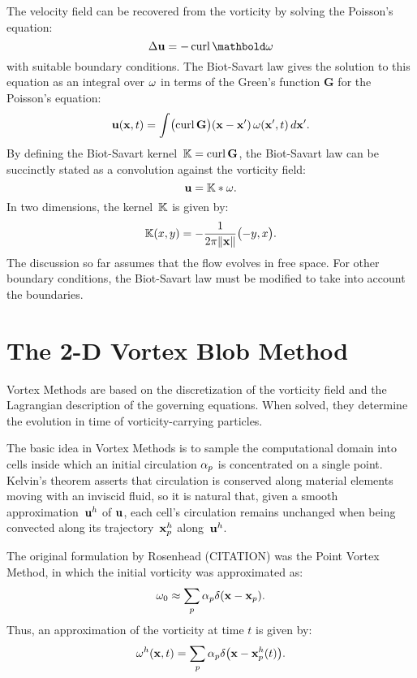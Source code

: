 The velocity field can be recovered from the vorticity by solving the Poisson's equation:
\begin{equation}
  \lapl\vel = -\curl\mathbold\vort
\end{equation}
with suitable boundary conditions.
The Biot-Savart law gives the solution to this equation as an integral over \(\omega\)
in terms of the Green's function \(\mathbf G\) for the Poisson's equation:
\begin{equation}
  \label{eq:integral-biot-savart-law}
  \mathbf u(\mathbf x, t) = \int\bigl(\operatorname{curl}\mathbf G\bigr)(\mathbf x - \mathbf x')\,\omega(\mathbf x', t)\,d\mathbf x'.
\end{equation}
By defining the Biot-Savart kernel~\(\mathbb{K} = \operatorname{curl}\mathbf G\),
the Biot-Savart law can be succinctly stated as a convolution against the vorticity field:
\begin{equation}
  \label{eq:biot-savart-law}
  \mathbf u = \mathbb{K} * \omega.
\end{equation}
In two dimensions, the kernel~\(\mathbb{K}\) is given by:
\begin{equation}
  \label{eq:2d-biot-savart-kernel}
  \mathbb{K}(x, y) = -\frac{1}{2\pi\lVert\mathbf x\rVert}\bigl(-y, x\bigr).
\end{equation}
The discussion so far assumes that the flow evolves in free space.
For other boundary conditions, the Biot-Savart law must be modified
to take into account the boundaries.



\section{The 2-D Vortex Blob Method}
\label{sec:vortex-blob-method}

Vortex Methods are based on the discretization of the vorticity field
and the Lagrangian description of the governing equations.
When solved, they determine the evolution in time of vorticity-carrying particles.

The basic idea in Vortex Methods is
to sample the computational domain into cells
inside which an initial circulation \(\alpha_p\) is concentrated on a single point.
Kelvin's theorem asserts that circulation is conserved
along material elements moving with an inviscid fluid,
so it is natural that,
given a smooth approximation~\(\mathbf u^h\) of \(\mathbf u\),
each cell's circulation remains unchanged when being convected
along its trajectory~\(\mathbf x_p^h\) along~\(\mathbf u^h\).

The original formulation by Rosenhead (CITATION) was the Point Vortex Method,
in which the initial vorticity was approximated as:
\begin{equation}
  \label{eq:initial-vorticity-approximation}
  \omega_0\approx\sum_p\alpha_p\delta(\mathbf x - \mathbf x_p).
\end{equation}
Thus, an approximation of the vorticity at time \(t\) is given by:
\begin{equation}
  \omega^h(\mathbf x, t)=\sum_p\alpha_p\delta\bigl(\mathbf x - \mathbf x^h_p(t)\bigr).
\end{equation}







